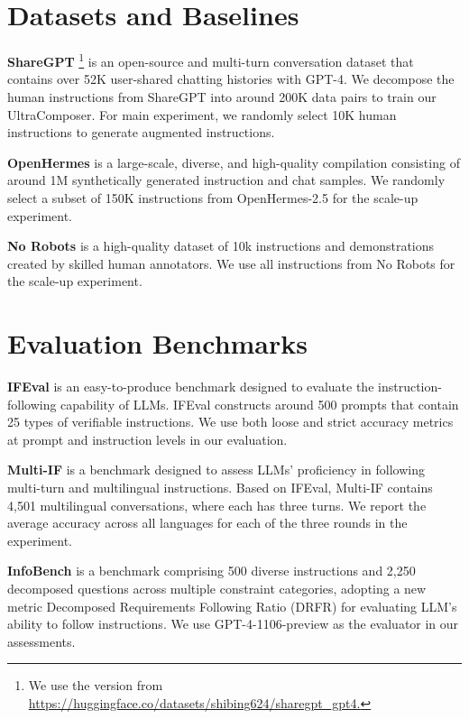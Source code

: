 \section{Datasets and Baselines}
\label{sec:dataset}
\textbf{ShareGPT} \footnote{We use the version from \href{https://huggingface.co/datasets/shibing624/sharegpt\_gpt4}{https://huggingface.co/datasets/shibing624/sharegpt\_gpt4.}} is an open-source and multi-turn conversation dataset that contains over 52K user-shared chatting histories with GPT-4. We decompose the human instructions from ShareGPT into around 200K data pairs to train our UltraComposer. For main experiment, we randomly select 10K human instructions to generate augmented instructions.

\textbf{OpenHermes} \citep{OpenHermes} is a large-scale, diverse, and high-quality compilation consisting of around 1M synthetically generated instruction and chat samples. We randomly select a subset of 150K instructions from OpenHermes-2.5 for the scale-up experiment.

\textbf{No Robots} \citep{no_robots} is a high-quality dataset of 10k instructions and demonstrations created by skilled human annotators. We use all instructions from No Robots for the scale-up experiment.


\section{Evaluation Benchmarks}
\label{sec:benchmark}
\textbf{IFEval} \citep{zhou2023instruction} is an easy-to-produce benchmark designed to evaluate the instruction-following capability of LLMs. IFEval constructs around 500 prompts that contain 25 types of verifiable instructions. We use both loose and strict accuracy metrics at prompt and instruction levels in our evaluation. 

\textbf{Multi-IF} \citep{he2024multi} is a benchmark designed to assess LLMs' proficiency in following multi-turn and multilingual instructions. Based on IFEval, Multi-IF contains 4,501 multilingual conversations, where each has three turns. We report the average accuracy across all languages for each of the three rounds in the experiment.

\textbf{InfoBench} \citep{qin2024infobench} is a benchmark comprising 500 diverse instructions and 2,250 decomposed questions across multiple constraint categories, adopting a new
metric Decomposed Requirements Following Ratio (DRFR) for evaluating LLM's ability to follow instructions. We use GPT-4-1106-preview as the evaluator in our assessments.


